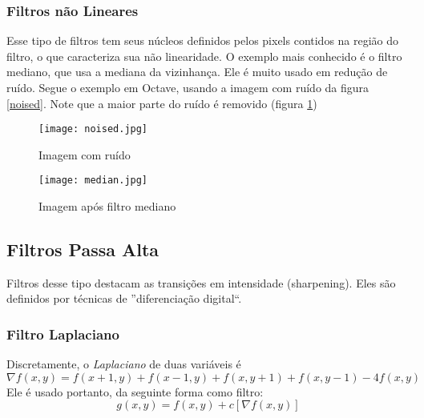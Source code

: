 \documentclass[a4paper,12pt,twoside]{article}
\begin{document}
\newpage
\subsubsection{Filtros não Lineares}
Esse tipo de filtros tem seus núcleos definidos pelos pixels contidos na região do filtro, o que caracteriza sua não linearidade.
O exemplo mais conhecido é o filtro mediano, que usa a  mediana da vizinhança. 
Ele é muito usado em redução de ruído.
Segue o exemplo em Octave, usando a imagem com ruído da figura \ref{noised}.
Note que a maior parte do ruído é removido (figura \ref{median})

\begin{figure}[h]
    \centering
    \begin{minipage}{0.48\textwidth}
        \centering
  \texttt{[image: noised.jpg]}
    \caption{Imagem com ruído}\label{noised}
    \end{minipage}
    \begin{minipage}{0.48\textwidth}
        \centering
  \texttt{[image: median.jpg]}
        \caption{Imagem após filtro mediano}\label{median}
    \end{minipage}
\end{figure}

\newpage

\subsection{Filtros Passa Alta}
Filtros desse tipo destacam as transições em intensidade (sharpening).
Eles são definidos por técnicas de ''diferenciação digital``.
\subsubsection{Filtro Laplaciano}
Discretamente, o \textit{Laplaciano} de duas variáveis é
\begin{equation}
    \nabla{f(x,y)} = f(x+1, y) + f(x-1, y) + f(x, y+1) + f(x, y-1) - 4f(x,y)
\end{equation}
Ele é usado portanto, da seguinte forma como filtro:
\begin{equation}
    g(x,y) = f(x,y) + c[\nabla{f(x,y)}] 
\end{equation}
\end{document}
